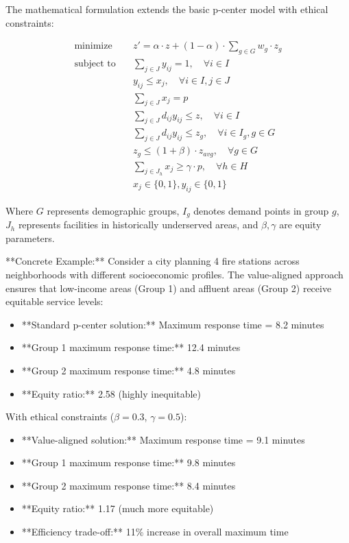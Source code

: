 \documentclass{article}
\begin{document}
The mathematical formulation extends the basic p-center model with ethical constraints:

\begin{align}
\text{minimize} \quad &z' = \alpha \cdot z + (1-\alpha) \cdot \sum_{g \in G} w_g \cdot z_g \\
\text{subject to} \quad &\sum_{j \in J} y_{ij} = 1, \quad \forall i \in I \\
&y_{ij} \leq x_j, \quad \forall i \in I, j \in J \\
&\sum_{j \in J} x_j = p \\
&\sum_{j \in J} d_{ij} y_{ij} \leq z, \quad \forall i \in I \\
&\sum_{j \in J} d_{ij} y_{ij} \leq z_g, \quad \forall i \in I_g, g \in G \\
&z_g \leq (1 + \beta) \cdot z_{avg}, \quad \forall g \in G \\
&\sum_{j \in J_h} x_j \geq \gamma \cdot p, \quad \forall h \in H \\
&x_j \in \{0, 1\}, y_{ij} \in \{0, 1\}
\end{align}

Where $G$ represents demographic groups, $I_g$ denotes demand points in group $g$, $J_h$ represents facilities in historically underserved areas, and $\beta, \gamma$ are equity parameters.

**Concrete Example:** Consider a city planning 4 fire stations across neighborhoods with different socioeconomic profiles. The value-aligned approach ensures that low-income areas (Group 1) and affluent areas (Group 2) receive equitable service levels:

\begin{itemize}
\item **Standard p-center solution:** Maximum response time = 8.2 minutes
\item **Group 1 maximum response time:** 12.4 minutes  
\item **Group 2 maximum response time:** 4.8 minutes
\item **Equity ratio:** 2.58 (highly inequitable)
\end{itemize}

With ethical constraints ($\beta = 0.3$, $\gamma = 0.5$):
\begin{itemize}
\item **Value-aligned solution:** Maximum response time = 9.1 minutes
\item **Group 1 maximum response time:** 9.8 minutes
\item **Group 2 maximum response time:** 8.4 minutes  
\item **Equity ratio:** 1.17 (much more equitable)
\item **Efficiency trade-off:** 11\% increase in overall maximum time
\end{itemize}
\end{document}
